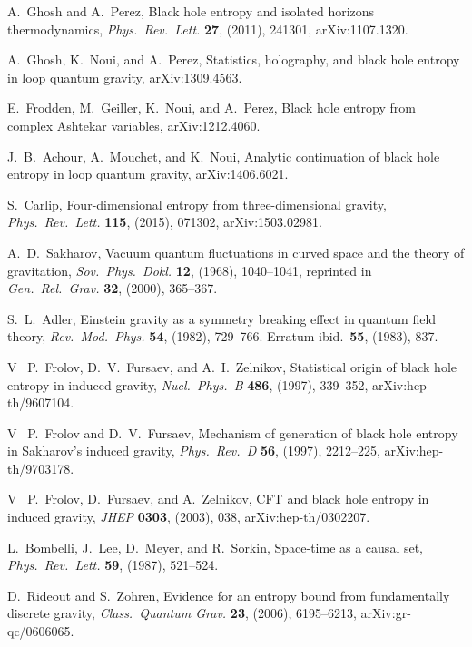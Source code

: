 \documentclass[11pt]{article}
\begin{document}
\begin{thebibliography}{999}
  A.\ Ghosh and A.\ Perez, Black hole entropy and
isolated horizons thermodynamics, \emph{Phys.\ Rev.\ Lett.} {\bf 27},
(2011), 241301, arXiv:1107.1320.

 A.\ Ghosh, K.\ Noui, and A.\ Perez, Statistics, 
holography, and black hole entropy in loop quantum gravity,
arXiv:1309.4563.

 E.\ Frodden, M.\ Geiller, K.\ Noui, and A.\ Perez,
Black hole entropy from complex Ashtekar variables, arXiv:1212.4060.

 J.~B.\ Achour, A.\ Mouchet, and K.\ Noui,
Analytic continuation of black hole entropy in loop quantum 
gravity, arXiv:1406.6021. 

 S.~Carlip, Four-dimensional entropy from 
three-dimensional gravity, \emph{ Phys.\ Rev.\ Lett.} {\bf 115}, 
(2015), 071302, arXiv:1503.02981.

  A.\ D.\ Sakharov, Vacuum quantum fluctuations 
in curved space and the theory of gravitation, \emph{Sov.\ Phys.\ Dokl.}
{\bf 12}, (1968), 1040--1041, reprinted in \emph{Gen.\ Rel.\ Grav.} 
{\bf 32}, (2000), 365--367.

 S.\ L.\ Adler, Einstein gravity as a symmetry breaking 
effect in quantum field theory, \emph{Rev.\ Mod.\ Phys.} {\bf 54}, (1982),
729--766.   Erratum ibid.\ {\bf 55}, (1983), 837.

 V~ P.\ Frolov, D.~V.\ Fursaev, and A.~I.\ Zelnikov,
Statistical origin of black hole entropy in induced gravity,
\emph{Nucl.\ Phys.\ B} {\bf 486}, (1997), 339--352,
arXiv:hep-th/9607104.

 V~ P.\ Frolov and D.~V.\ Fursaev, Mechanism of 
generation of black hole entropy in Sakharov's induced gravity,
\emph{Phys.\ Rev.\ D} {\bf 56}, (1997),  2212--225,
arXiv:hep-th/9703178.

 V~ P.\ Frolov, D.\ Fursaev, and A.\ Zelnikov, 
CFT and black hole entropy in induced gravity, \emph{JHEP}
{\bf 0303}, (2003), 038, arXiv:hep-th/0302207.

  L.\ Bombelli, J.\ Lee, D.\ Meyer, and R.\ Sorkin,
Space-time as a causal set, \emph{Phys.\ Rev.\ Lett.} {\bf 59}, (1987), 
521--524.

 D.\ Rideout and S.\ Zohren, Evidence for an 
entropy bound from fundamentally discrete gravity, \emph{Class.\ 
Quantum Grav.} {\bf 23}, (2006),  6195--6213, arXiv:gr-qc/0606065.


\end{thebibliography}
\end{document}
